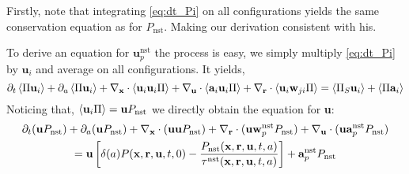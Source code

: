 Firstly, note that integrating \ref{eq:dt_Pi} on all configurations yields the same conservation equation as \citet{zhang2023evolution} for $P_\text{nst}$. 
Making our derivation consistent with his. 


To derive an equation for $\textbf{u}_p^\text{nst}$ the process is easy, 
we simply multiply \ref{eq:dt_Pi} by $\textbf{u}_i$ and average on all configurations. 
It yields, 
\begin{equation*}
    \partial_t \left<\Pi \textbf{u}_i\right>
    + \partial_a \left<\Pi  \textbf{u}_i\right>
    + {\mathbf{\nabla}_\textbf{x}}\cdot\left<\textbf{u}_i \textbf{u}_i  \Pi\right>
    + {\mathbf{\nabla}_\textbf{u}}\cdot\left<\textbf{a}_i \textbf{u}_i  \Pi\right>
    + {\mathbf{\nabla}_\textbf{r}}\cdot \left< \textbf{u}_i \textbf{w}_{ji} \Pi\right>
    = 
    \left<\Pi_S \textbf{u}_i\right>
    + \left<\Pi \textbf{a}_i \right>
\end{equation*}
Noticing that, $\left<\textbf{u}_i \Pi\right> = \textbf{u}P_\text{nst}$ we directly obtain the equation for \textbf{u}:
\begin{multline*}
    \partial_t (\textbf{u} P_\text{nst})
    + \partial_a (\textbf{u} P_\text{nst})
    + {\mathbf{\nabla}_\textbf{x}} \cdot  (\textbf{u} \textbf{u}  P_\text{nst})
    + {\mathbf{\nabla}_\textbf{r}} \cdot  (\textbf{u}\textbf{w}^\text{nst}_p P_\text{nst})
    + {\mathbf{\nabla}_\textbf{u}} \cdot  (\textbf{u}\textbf{a}^\text{nst}_p P_\text{nst})\\
    = \textbf{u} 
    \left[\delta(a)  P(\textbf{x},\textbf{r}, \textbf{u},t,0)
    - \frac{P_\text{nst}(\textbf{x},\textbf{r},\textbf{u},t,a)}{\tau^\text{nst}(\textbf{x},\textbf{r},\textbf{u},t,a)}
    \right]
    + \textbf{a}_p^\text{nst}
    P_\text{nst} 
\end{multline*}


